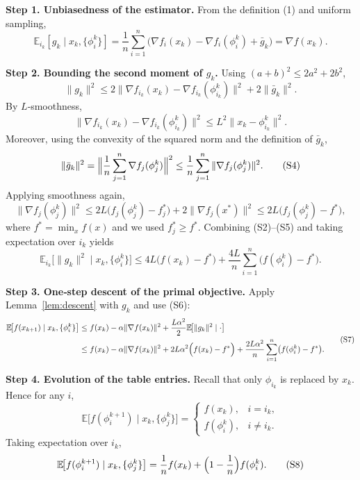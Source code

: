 \documentclass{article}
\newcommand{\E}{\mathbb{E}}
\begin{document}
\noindent\textbf{Step 1. Unbiasedness of the estimator.}  
From the definition (1) and uniform sampling,
\[
\E_{i_k}[g_k\mid x_k,\{\phi_i^k\}]
 =\frac{1}{n}\sum_{i=1}^{n}
   \bigl(\nabla f_i(x_k)-\nabla f_i(\phi_i^k)+\bar g_k\bigr)
 =\nabla f(x_k). \tag{S1}
\]

\noindent\textbf{Step 2. Bounding the second moment of $g_k$.}  
Using $(a+b)^{2}\le 2a^{2}+2b^{2}$,
\[
\|g_k\|^{2}
\le 2\|\nabla f_{i_k}(x_k)-\nabla f_{i_k}(\phi_{i_k}^k)\|^{2}
   +2\|\bar g_k\|^{2}. \tag{S2}
\]
By $L$‑smoothness,
\[
\|\nabla f_{i_k}(x_k)-\nabla f_{i_k}(\phi_{i_k}^k)\|^{2}
\le L^{2}\|x_k-\phi_{i_k}^k\|^{2}. \tag{S3}
\]
Moreover, using the convexity of the squared norm and the definition of $\bar g_k$,
\[
\|\bar g_k\|^{2}
= \Bigl\|\frac{1}{n}\sum_{j=1}^{n}\nabla f_j(\phi_j^k)\Bigr\|^{2}
\le \frac{1}{n}\sum_{j=1}^{n}\|\nabla f_j(\phi_j^k)\|^{2}. \tag{S4}
\]
Applying smoothness again,
\[
\|\nabla f_j(\phi_j^k)\|^{2}
\le 2L\bigl(f_j(\phi_j^k)-f_j^{*}\bigr)
     +2\|\nabla f_j(x^{*})\|^{2}
\le 2L\bigl(f_j(\phi_j^k)-f^{*}\bigr), \tag{S5}
\]
where $f^{*}=\min_x f(x)$ and we used $f_j^{*}\ge f^{*}$.
Combining (S2)–(S5) and taking expectation over $i_k$ yields
\[
\E_{i_k}\!\bigl[\|g_k\|^{2}\mid x_k,\{\phi_i^k\}\bigr]
\le 4L\bigl(f(x_k)-f^{*}\bigr)
   +\frac{4L}{n}\sum_{i=1}^{n}\bigl(f(\phi_i^k)-f^{*}\bigr). \tag{S6}
\]

\noindent\textbf{Step 3. One‑step descent of the primal objective.}  
Apply Lemma~\ref{lem:descent} with $g_k$ and use (S6):
\[
\begin{aligned}
\E\!\bigl[f(x_{k+1})\mid x_k,\{\phi_i^k\}\bigr]
&\le f(x_k)-\alpha\|\nabla f(x_k)\|^{2}
   +\frac{L\alpha^{2}}{2}\E\!\bigl[\|g_k\|^{2}\mid\cdot\bigr] \\
&\le f(x_k)-\alpha\|\nabla f(x_k)\|^{2}
   +2L\alpha^{2}\Bigl(f(x_k)-f^{*}\Bigr)
   +\frac{2L\alpha^{2}}{n}\sum_{i=1}^{n}\bigl(f(\phi_i^k)-f^{*}\bigr).
\end{aligned}
\tag{S7}
\]

\noindent\textbf{Step 4. Evolution of the table entries.}  
Recall that only $\phi_{i_k}$ is replaced by $x_k$.
Hence for any $i$,
\[
\E\!\bigl[f(\phi_i^{k+1})\mid x_k,\{\phi_j^k\}\bigr]
=
\begin{cases}
f(x_k), & i=i_k,\\[2mm]
f(\phi_i^k), & i\neq i_k .
\end{cases}
\]
Taking expectation over $i_k$,
\[
\E\!\bigl[f(\phi_i^{k+1})\mid x_k,\{\phi_j^k\}\bigr]
= \frac{1}{n}f(x_k)+\Bigl(1-\frac{1}{n}\Bigr)f(\phi_i^k). \tag{S8}
\]
\end{document}
